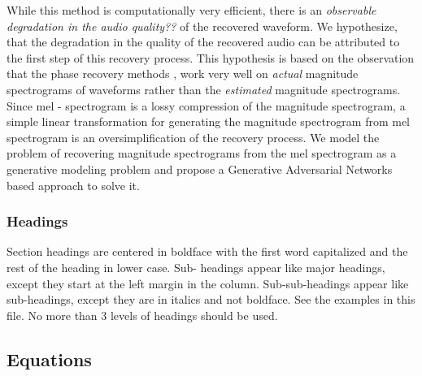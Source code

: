 \documentclass[a4paper]{article}
\begin{document}
While this method is computationally very efficient, there is an \textit{observable degradation in the audio quality??} of the recovered waveform. We hypothesize, that the degradation in the quality of the recovered audio can be attributed to the first step of this recovery process. This hypothesis is based on the observation that the phase recovery methods \cite{lws}, work very well on \textit{actual} magnitude spectrograms of waveforms rather than the \textit{estimated} magnitude spectrograms. 
Since mel - spectrogram is a lossy compression of the magnitude spectrogram, a simple linear transformation for generating the magnitude spectrogram from mel spectrogram is an oversimplification of the recovery process. 
We model the problem of recovering magnitude spectrograms from the mel spectrogram as a generative modeling problem and propose a Generative Adversarial Networks based approach to solve it. 




\subsubsection{Headings}

Section headings are centered in boldface with the first word capitalized and the rest of the heading in lower case. Sub- headings appear like major headings, except they start at the left margin in the column. Sub-sub-headings appear like sub-headings, except they are in italics and not boldface. See the examples in this file. No more than 3 levels of headings should be used.

\subsection{Equations}
\end{document}
